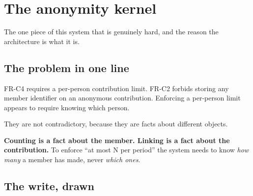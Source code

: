 \documentclass[11pt,a4paper]{article}
\begin{document}
\section{The anonymity kernel}\label{sec:kernel}

The one piece of this system that is genuinely hard, and the reason the
architecture is what it is.

\subsection{The problem in one line}

FR-C4 requires a per-person contribution limit. FR-C2 forbids storing any member
identifier on an anonymous contribution. Enforcing a per-person limit appears to
require knowing which person.

\begin{why}
They are not contradictory, because they are facts about different objects.

\textbf{Counting is a fact about the member. Linking is a fact about the
contribution.} To enforce ``at most N per period'' the system needs to know
\emph{how many} a member has made, never \emph{which ones}.
\end{why}

\subsection{The write, drawn}
\end{document}
